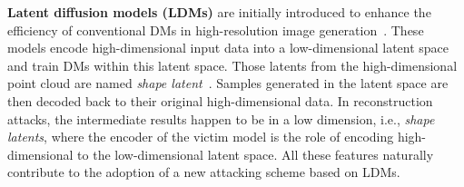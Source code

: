 \noindent\textbf{Latent diffusion models (LDMs)} are initially introduced to enhance the efficiency of conventional DMs in high-resolution image generation~\cite{rombach2022ldm}. These models encode high-dimensional input data into a low-dimensional latent space and train DMs within this latent space. Those latents from the high-dimensional point cloud are named \textit{shape latent}~\cite{zeng2022lion}.
Samples generated in the latent space are then decoded back to their original high-dimensional data. 
In reconstruction attacks, the intermediate results happen to be in a low dimension, i.e., \textit{shape latents}, where the encoder of the victim model is the role of encoding high-dimensional to the low-dimensional latent space. All these features naturally contribute to the adoption of a new attacking scheme based on LDMs.